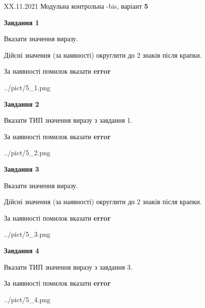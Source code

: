 \documentclass[11pt, ukrainian]{article}
\begin{document}
{XX.11.2021 Модульна контрольна -bis, варіант  \No \textbf { 5 }\par}
{
\begin {large}
{\begin {center}\textbf{Завдання 1}\end {center}}\par
Вказати значення виразу. \par
Дійсні значення (за наявності) округлити до 2 знаків після крапки. \par
За наявності помилок вказати \textbf{error}

\begin{center}
	{../pict/5_1.png}
\end{center}
\newpage

{\begin {center}\textbf{Завдання 2}\end {center}}\par
Вказати ТИП значення виразу з завдання 1. \par
За наявності помилок вказати \textbf{error}

\begin{center}
	{../pict/5_2.png}
\end{center}
\newpage

{\begin {center}\textbf{Завдання 3}\end {center}}\par
Вказати значення виразу. \par
Дійсні значення (за наявності) округлити до 2 знаків після крапки. \par
За наявності помилок вказати \textbf{error}

\begin{center}
	{../pict/5_3.png}
\end{center}
\newpage

{\begin {center}\textbf{Завдання 4}\end {center}}\par
Вказати ТИП значення виразу з завдання 3. \par
За наявності помилок вказати \textbf{error}

\begin{center}
	{../pict/5_4.png}
\end{center}
\newpage


\end{large}}
\end{document}
